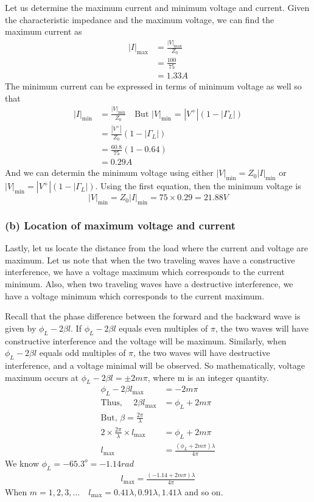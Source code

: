 \begin{exmp}
Let us determine the maximum current and minimum voltage and current. Given the characteristic impedance and the maximum voltage, we can find the maximum current as 
\begin{align*}
|I|_\max&=\frac{|V|_\max}{Z_0}\\
&=\frac{100}{75}\\
&=1.33A
\end{align*}
The minimum current can be expressed in terms of minimum voltage as well so that
\begin{align*}
|I|_\min&=\frac{|V|_\min}{Z_0}\quad\text{But }|V|_\min\text{ = }|V^+|(1 - |\Gamma_L|)\\
&=\frac{|V^{+}|}{Z_0}(1-|\Gamma_{L}|)\\
&=\frac{60.8}{75}(1-0.64)\\
&=0.29A
\end{align*}
And we can determin the minimum voltage using either $|V|_\min=Z_0|I|_\min$ or $|V|_\min=|V^{+}|(1-|\Gamma_{L}|)$. Using the first equation, then the minimum voltage is	
\begin{dmath*}
|V|_\min=Z_0|I|_\min
=75\times0.29=21.88V
\end{dmath*}

\subsubsection*{(b) Location of maximum voltage and current}
Lastly, let us locate the distance from the load where the current and voltage are maximum. Let us note that when the two traveling waves have a constructive interference, we have a voltage maximum which corresponds to the current minimum. Also, when two traveling waves have a destructive interference, we have a voltage minimum which corresponds to the current maximum.

Recall that the phase difference between the forward and the backward wave is given by $\phi_{L}-2\beta l$. If $\phi_{L}-2\beta l$ equals even multiples of $\pi$, the two waves will have constructive interference and the voltage will be maximum. Similarly, when $\phi_{L}-2\beta l$ equals odd multiples of $\pi$, the two waves will have destructive interference, and a voltage minimal will be observed. So mathematically, voltage maximum occurs at $\phi_{L}-2\beta l= \pm2m\pi$, where m is an integer quantity.
\begin{align*}
\phi_{L}-2\beta l_\max&=-2m\pi\\
\text{Thus, }\quad2\beta l_\max&= \phi_{L}+2m\pi\\
\text{But, }\beta = \frac{2\pi}{\lambda}\\
2 \times \frac{2\pi}{\lambda}\times l_\max&= \phi_{L}+2m\pi\\
l_\max&=\frac{(\phi_L + 2m\pi)\lambda}{4\pi}
\end{align*}
We know $\phi_{L}=-65.3^o=-1.14rad$
\begin{align*}
l_\max=\frac{(-1.14 + 2m\pi)\lambda}{4\pi}
\end{align*}
When $m = 1,2,3, \ldots\quad l_\max=0.41\lambda, 0.91\lambda, 1.41\lambda$ and so on.


\end{exmp}
